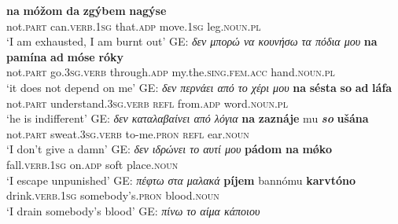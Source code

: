 \documentclass[output=paper,colorlinks,citecolor=brown]{langscibook}
\begin{document}
\begin{xlist}
\ex 
\gll \textbf{{na}} \textbf{{móžom}} \textbf{{da}} \textbf{{zgýbem}} \textbf{{nagýse}} \\
not.\textsc{part} can.\textsc{verb.1sg} that.\textsc{adp} move.\textsc{1sg}  leg.\textsc{noun.pl}\\
\glt `I am exhausted, I am burnt out' GE: \textit{δεν μπορώ να κουνήσω τα πόδια μου} 
\ex
\gll \textbf{{na}} \textbf{{pamína}} \textbf{{ad}} \textbf{{móse}} \textbf{{róky}}\\
not.\textsc{part} go.\textsc{3sg.verb} through.\textsc{adp} my.the.\textsc{sing.fem.acc} hand.\textsc{noun.pl}\\
\glt `it does not depend on me' GE: \textit{δεν περνάει από το χέρι μου}
\ex
\gll \textbf{{na}} {\textbf{sésta }} {\textbf{so}} \textbf{{ad}} \textbf{{láfa}} \\ 
not.\textsc{part} understand.\textsc{3sg.verb} \textsc{refl} from.\textsc{adp} word.\textsc{noun.pl}\\ 
\glt `he is indifferent' GE: \textit{δεν καταλαβαίνει από λόγια}
\ex 
\gll \textbf{{na}} \textbf{{zaznáje}} mu \textbf{\em{so}} \textbf{{ušána}} \\
not.\textsc{part}  sweat.\textsc{3sg.verb} to-me.\textsc{pron} \textsc{refl} ear.\textsc{noun}\\
\glt `I don't give a damn' GE: \textit{δεν ιδρώνει το αυτί μου}
\ex 
\gll \textbf{{pádom}} \textbf{{na}} \textbf{{mǿko}} \\
fall.\textsc{verb.1sg}  on.\textsc{adp}  {soft place}.\textsc{noun}\\
\glt `I escape unpunished' GE: \textit{πέφτω στα μαλακά}
\ex
\gll 	\textbf{{píjem}} bannómu \textbf{{karvtóno}} \\
drink.\textsc{verb.1sg}  somebody's.\textsc{pron} blood.\textsc{noun}\\
\glt `I  drain somebody's blood' GE: \textit{πίνω το αίμα κάποιου}

\end{xlist}
\end{document}
